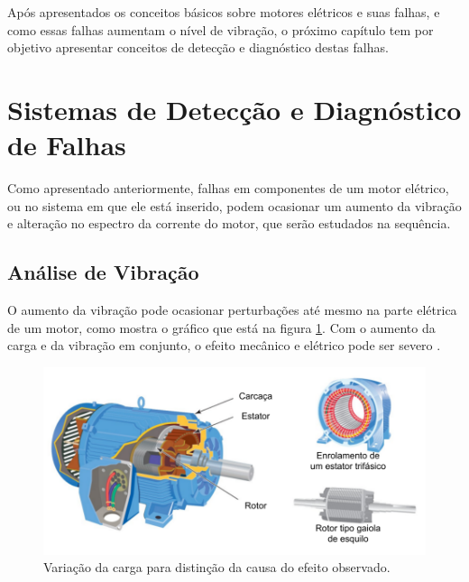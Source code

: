 Após apresentados os conceitos básicos sobre motores elétricos e suas falhas, e como essas falhas aumentam o nível de vibração,
o próximo capítulo tem por objetivo apresentar conceitos de detecção e diagnóstico destas falhas.


% 

\section{Sistemas de Detecção e Diagnóstico de Falhas}\label{sec:}

Como apresentado anteriormente, falhas em componentes de um motor elétrico, ou no sistema em que ele está inserido, podem ocasionar
um aumento da vibração e alteração no espectro da corrente do motor, que serão estudados na sequência.


% 

\subsection{Análise de Vibração}\label{subsec:}

O aumento da vibração pode ocasionar perturbações até mesmo na parte elétrica de um motor, como mostra o gráfico que está na 
figura \ref{fig:fault_effect_randall_p54}. Com o aumento da carga e da vibração em conjunto, o efeito mecânico e elétrico pode ser 
severo .

\begin{figure}[H]
    \caption{Variação da carga para distinção da causa do efeito observado.}
    \begin{center}
        \includegraphics[scale=0.8, page=5]{referencial/img/imagens_referencial.pdf}
    \end{center}
    \label{fig:fault_effect_randall_p54}
\end{figure}


